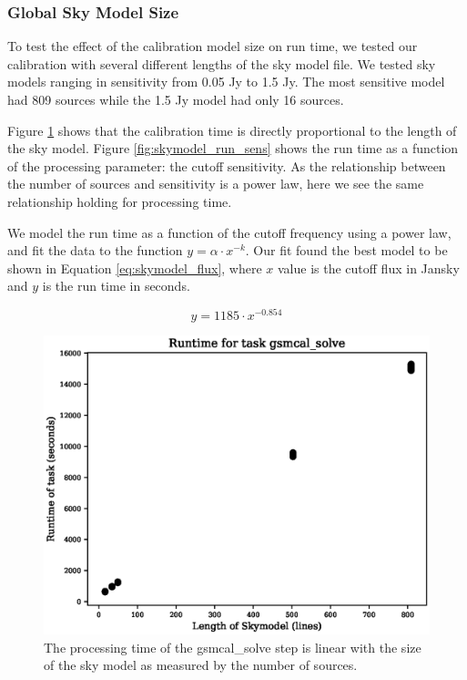\documentclass[preprint,5p]{elsarticle}
\begin{document}
\subsubsection{Global Sky Model Size}
To test the effect of the calibration model size on run time, we tested our calibration with several different lengths of the sky model file. We tested sky models ranging in sensitivity from 0.05 Jy to 1.5 Jy. The most sensitive model had 809 sources while the 1.5 Jy model had only 16 sources. 

Figure \ref{fig:skymodel_run_lenght} shows that the calibration time is directly proportional to the length of the sky model. Figure \ref{fig:skymodel_run_sens} shows the run time as a function of the processing parameter: the cutoff sensitivity. As the relationship between the number of sources and sensitivity is a power law, here we see the same relationship holding for processing time.

We model the run time as a function of the cutoff frequency using a power law, and fit the data to the function $y=\alpha\cdot x^{-k}$. Our fit found the best model to be shown in Equation \ref{eq:skymodel_flux}, where $x$ value is the cutoff flux in Jansky and $y$ is the run time in seconds. 

\begin{equation}
    y=1185\cdot x^{-0.854}
\label{eq:skymodel_flux}
\end{equation}

\begin{figure}
    \includegraphics[width=0.95\linewidth]{figures/skymodel_length.eps}
      \caption{The processing time of the gsmcal\_solve step is linear with the size of the sky model as measured by the number of sources.}
	\label{fig:skymodel_run_lenght}
\end{figure}
\end{document}
